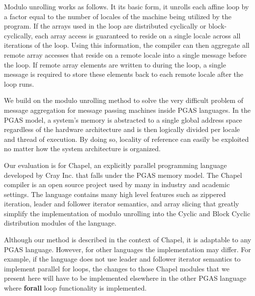 Modulo unrolling works as follows. It its basic form, it unrolls each affine loop by a factor equal to the number of locales of the machine being utilized by the program. If the arrays used in the loop are distributed cyclically or block-cyclically, each array access is guaranteed to reside on a single locale across all iterations of the loop. Using this information, the compiler can then aggregate all remote array accesses that reside on a remote locale into a single message before the loop. If remote array elements are written to during the loop, a single message is required to store these elements back to each remote locale after the loop runs. 

We build on the modulo unrolling method to solve the very difficult problem of message aggregation for message passing machines inside PGAS languages. In the PGAS model, a system's memory is abstracted to a single global address space regardless of the hardware architecture and is then logically divided per locale and thread of execution. By doing so, locality of reference can easily be exploited no matter how the system architecture is organized.

Our evaluation is for Chapel, an explicitly parallel programming language developed by Cray Inc. that falls under the PGAS memory model. The Chapel compiler is an open source project used by many in industry and academic settings. The language contains many high level features such as zippered iteration, leader and follower iterator semantics, and array slicing that greatly simplify the implementation of modulo unrolling into the Cyclic and Block Cyclic distribution modules of the language.

Although our method is described in the context of Chapel, it is adaptable to any PGAS language. However, for other languages the implementation may differ. For example, if the language does not use leader and follower iterator semantics to implement parallel for loops, the changes to those Chapel modules that we present here will have to be implemented elsewhere in the other PGAS language where \textbf{forall} loop functionality is implemented.